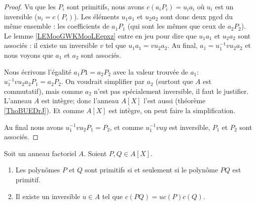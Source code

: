 \begin{proof}
	Vu que les \( P_i\) sont primitifs, nous avons \( c(a_iP_i)=u_ia_i\) où \( u_i \) est un inversible (\( u_i=c(P_i)\)). Les éléments \( u_1a_1\) et \( u_2a_2\) sont donc deux pgcd du même ensemble : les coefficients de \( a_1P_1\) (qui sont les mêmes que ceux de \( a_2P_2\)). Le lemme \ref{LEMooGWKMooLEepxz} entre en jeu pour dire que \( u_1a_1\) et \( u_2a_2\) sont associés : il existe un inversible \( v\) tel que \( u_1a_1=vu_2a_2\). Au final, \( a_1=u_1^{-1} vu_2 a_2\) et nous voyons que \( a_1\) et \( a_2\) sont associés.

	Nous écrivons l'égalité \( a_1P1=a_2P_2\) avec la valeur trouvée de \( a_1\): \( u_1^{-1}vu_2a_2P_1=a_2P_2\). On voudrait simplifier par \( a_2\) (surtout que \( A\) est commutatif), mais comme \( a_2\) n'est pas spécialement inversible, il faut le justifier. L'anneau \( A\) est intègre; donc l'anneau \( A[X]\) l'est aussi (théorème \ref{ThoBUEDrJ}). Et comme \( A[X]\) est intègre, on peut faire la simplification.

	Au final nous avons \( u_1^{-1}vu_2P_1=P_2\), et comme \( u_1^{-1}vuy\) est inversible, \( P_1\) et \( P_2\) sont associés.
\end{proof}


\begin{lemma}		\label{LEMooHJECooTeELgN}
	Soit un anneau factoriel \( A\). Soient \( P,Q\in A[X]\).
	\begin{enumerate}
		\item		\label{ITEMooISPDooXdRywE}
		      Les polynômes \( P\) et \( Q\) sont primitifs si et seulement si le polynôme \( PQ\) est primitif.
		\item		\label{ITEMooLWEEooLcDlfp}
		      Il existe un inversible \( u\in A\) tel que \( c(PQ)=uc(P)c(Q)\).
	\end{enumerate}
\end{lemma}

